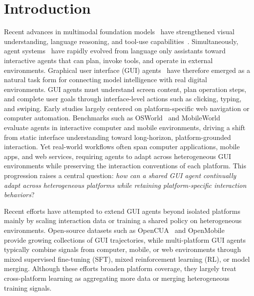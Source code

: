 \section{Introduction}
\label{sec:intro}

Recent advances in multimodal foundation models~\citep{qwen3-vl,
Claude-Opus-4.6, Seed2.0} have strengthened visual understanding,
language reasoning, and tool-use capabilities~\citep{tu2026consensus}. Simultaneously, agent
systems~\citep{MM-MEM, milestone, Audio-Oscar} have rapidly evolved from
language only assistants toward interactive agents that can plan, invoke
tools, and operate in external environments. Graphical user interface
(GUI) agents~\citep{UI-TARS-2,Mobile-agent-v3.5} have therefore emerged
as a natural task form for connecting model intelligence with real digital
environments. GUI agents must understand screen content, plan operation
steps, and complete user goals through interface-level actions such as
clicking, typing, and swiping. Early studies largely centered on 
platform-specific web navigation or computer automation. Benchmarks such as OSWorld~\citep{osworld} and
MobileWorld~\citep{mobileworld} evaluate agents in interactive computer
and mobile environments, driving a shift from static interface
understanding toward long-horizon, platform-grounded interaction. Yet
real-world workflows often span computer applications, mobile apps, and web
services, requiring agents to adapt across heterogeneous GUI environments while preserving the interaction
conventions of each platform. This progression raises a central question:
\textit{how can a shared GUI agent continually adapt across heterogeneous
platforms while retaining platform-specific interaction behaviors}?

Recent efforts have attempted to extend GUI agents beyond isolated
platforms mainly by scaling interaction data or training a shared policy
on heterogeneous environments. Open-source datasets such as
OpenCUA~\citep{Opencua} and OpenMobile~\citep{openmobile} provide
growing collections of GUI trajectories, while multi-platform GUI
agents~\citep{Mobile-agent-v3.5, UI-venus-1.5} typically combine signals
from computer, mobile, or web environments through mixed supervised
fine-tuning (SFT), mixed reinforcement learning (RL), or model merging.
Although these efforts broaden platform coverage, they largely treat
cross-platform learning as aggregating more data or merging heterogeneous
training signals.

